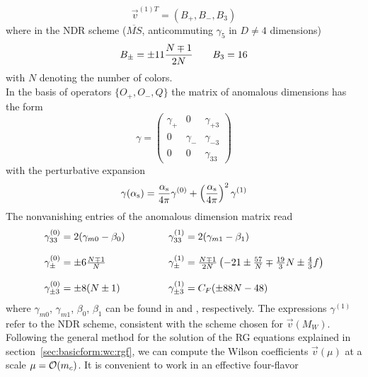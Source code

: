 \begin{equation}\label{v1} {\vec v^{(1)T}}=(B_+,B_-,B_3)  \end{equation}
where in the NDR scheme ($\overline{MS}$, anticommuting $\gamma_5$
in $D\not=4$ dimensions)
\begin{equation}\label{bpm3} B_\pm=\pm 11{N\mp 1\over 2N}\qquad B_3=16  \end{equation}
with $N$ denoting the number of colors.\\
In the basis of operators $\{ O_+,O_-,Q\}$ the matrix of anomalous
dimensions has the form
\begin{equation}\label{gz} \gamma =
 \left(\begin{array}{ccc} \gamma_+ & 0 & \gamma_{+3} \\
                           0 & \gamma_- & \gamma_{-3} \\
                           0 & 0 & \gamma_{33}
    \end{array}\right)   \end{equation}
with the perturbative expansion
\begin{equation}\label{ga2}
\gamma(\alpha_{\rm s})=\frac{\alpha_{\rm s}}{4 \pi} \gamma^{(0)}+\left(\frac{\alpha_{\rm s}}{4 \pi}\right)^2\gamma^{(1)}
\end{equation}
The nonvanishing entries of the anomalous dimension matrix read
\begin{equation}\label{gzij}
\begin{tabular}{lcl}
$\gamma^{(0)}_{33}=2(\gamma_{m0}-\beta_0)$ &\qquad\qquad&
   $\gamma^{(1)}_{33}=2(\gamma_{m1}-\beta_1)$ \\  & & \\
$\gamma^{(0)}_\pm=\pm 6{N\mp 1\over N}$ &  &
   $\gamma^{(1)}_\pm={N\mp 1\over 2N}\left(-21\pm{57\over N}\mp{19\over 3}N\pm{4\over 3}f
     \right)$ \\                                 & & \\
$\gamma^{(0)}_{\pm 3}=\pm 8(N\pm 1)$ &  &
   $\gamma^{(1)}_{\pm 3}=C_F(\pm 88 N-48)$ \\
\end{tabular}  \end{equation}
where $\gamma_{m0}$, $\gamma_{m1}$, $\beta_0$, $\beta_1$ can be found
in  and , respectively. The expressions
$\gamma^{(1)}$ refer to the NDR scheme, consistent with the scheme
chosen for $\vec v(M_W)$. Following the general method for the solution
of the RG equations explained in section~\ref{sec:basicform:wc:rgf}, we
can compute the Wilson coefficients $\vec v(\mu)$ at a scale
$\mu={\cal O}(m_c)$. It is convenient to work in an effective four-flavor

